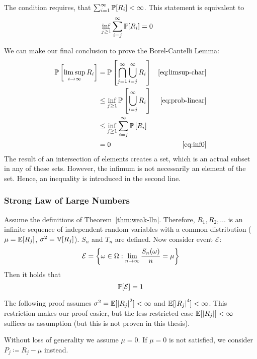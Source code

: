 The condition requires, that $\sum_{i=1}^\infty \mathbb P[R_i] < \infty$.
This statement is equivalent to
\begin{align}
  \inf_{j \geq 1} \sum_{i=j}^\infty \mathbb P[R_i] &= 0  \label{eq:inf0}
\end{align}

We can make our final conclusion to prove the Borel-Cantelli Lemma:
\begin{align}
  \mathbb P\left[\limsup_{i\to\infty} R_i\right]
    &= \mathbb P\left[\bigcap_{j=1}^\infty \bigcup_{i=j}^\infty R_i\right] & \eqref{eq:limsup-char} \notag\\
    &\leq \inf_{j \geq 1} \mathbb P\left[\bigcup_{i=j}^\infty R_i\right] & \eqref{eq:prob-linear}\notag\\
    &\leq \inf_{j \geq 1} \sum_{i=j}^\infty \mathbb P\left[R_i\right] \notag\\
    &= 0 & \eqref{eq:inf0}
\end{align}
The result of an intersection of elements creates a set, which
is an actual subset in any of these sets. However, the infimum
is not necessarily an element of the set. Hence, an inequality
is introduced in the second line.

\subsubsection{Strong Law of Large Numbers}
\label{sec:bp-strong-law}
%
\begin{theorem}\label{thm:slln}
  Assume the definitions of Theorem~\ref{thm:weak-lln}.
  Therefore, $R_1, R_2, \ldots$ is an infinite sequence of independent random variables
  with a common distribution ($\mu = \mathbb E[R_j]$, $\sigma^2 = \mathbb V[R_j]$). $S_n$ and $T_n$
  are defined. Now consider event $\mathcal E$:
  \[
    \mathcal E = \left\{
      \omega \in \Omega: \lim_{n\to\infty} \frac{S_n(\omega)}{n} = \mu
    \right\}
  \]
  Then it holds that
  \[ \mathbb P[\mathcal E] = 1 \]
\end{theorem}

The following proof assumes $\sigma^2 = \mathbb E[\left\lvert{R_j}\right\rvert^2] < \infty$ and $\mathbb E[\left\lvert{R_j}\right\rvert^4] < \infty$.
This restriction makes our proof easier, but the less restricted case $\mathbb E[\left\lvert{R_j}\right\rvert] < \infty$ suffices as assumption
(but this is not proven in this thesis).

Without loss of generality we assume $\mu = 0$.
If $\mu = 0$ is not satisfied, we consider $P_j \coloneqq R_j - \mu$ instead.

